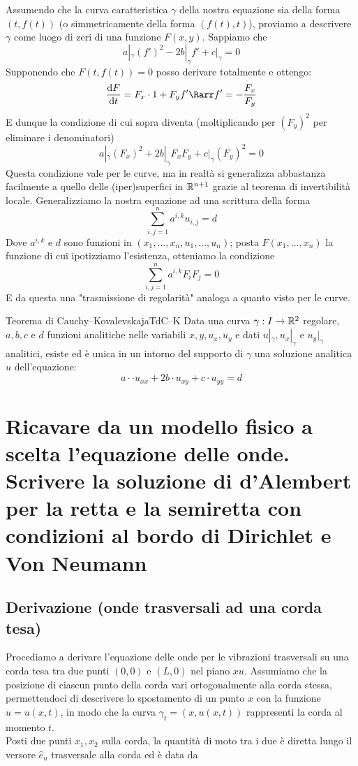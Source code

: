 \documentclass{article}
\begin{document}
Assumendo che la curva caratteristica $\gamma$ della nostra equazione sia della forma $(t,f(t))$ (o simmetricamente della forma $(f(t),t)$), proviamo a descrivere $\gamma$ come luogo di zeri di una funzione $F(x,y)$. Sappiamo che 
\[ a|_\gamma (f')^2 - 2b|_\gamma f' + c|_\gamma = 0 \]
Supponendo che $F(t,f(t))=0$ posso derivare totalmente e ottengo:
\[ \frac{\di F}{\di t} = F_x \cdot 1 + F_y f' \Rarr f' = - \frac{F_x}{F_y} \]
E dunque la condizione di cui sopra diventa (moltiplicando per $(F_y)^2$ per eliminare i denominatori)
\[ a|_\gamma (F_x)^2 + 2b|_\gamma F_x F_y + c|_\gamma (F_y)^2 = 0 \]
Questa condizione vale per le curve, ma in realtà si generalizza abbastanza facilmente a quello delle (iper)superfici in $\mathbb{R}^{n+1}$ grazie al teorema di invertibilità locale. Generalizziamo la nostra equazione ad una scrittura della forma
\[ \sum_{i,j = 1}^n a^{i,k} u_{i,j} = d \]
Dove $a^{i,k}$ e $d$ sono funzioni in $(x_1,..., x_n, u_1, ... , u_n)$; posta $F(x_1,..., x_n)$ la funzione di cui ipotizziamo l'esistenza, otteniamo la condizione
\[ \sum_{i,j=1}^n a^{i,k} F_i F_j = 0 \]
E da questa una "trasmissione di regolarità" analoga a quanto visto per le curve.

\begin{theorem}{Teorema di Cauchy--Kovalevskaja}{TdC--K}
    Data una curva $\gamma : I \to \mathbb{R}^2$ regolare, $a,b,c$ e $d$ funzioni analitiche nelle variabili $x,y, u_x, u_y$ e dati $u|_\gamma, u_x|_\gamma$ e $u_y|_\gamma$ analitici, esiste ed è unica in un intorno del supporto di $\gamma$ una soluzione analitica $u$ dell'equazione:
    \[ a\cdot \cdot u_{xx} + 2b \cdot u_{xy} + c \cdot  u_{yy} = d \]
\end{theorem}

\section{Ricavare da un modello fisico a scelta l'equazione delle onde. Scrivere la soluzione di d'Alembert per la retta e la semiretta con condizioni al bordo di Dirichlet e Von Neumann}

\subsection{Derivazione (onde trasversali ad una corda tesa)}

Procediamo a derivare l'equazione delle onde per le vibrazioni trasversali su una corda tesa tra due punti $(0,0)$ e $(L,0)$ nel piano $xu$. Assumiamo che la posizione di ciascun punto della corda vari ortogonalmente alla corda stessa, permettendoci di descrivere lo spostamento di un punto $x$ con la funzione $u = u(x,t)$, in modo che la curva $\gamma_t =(x, u(x,t))$ rappresenti la corda al momento $t$.\\
Posti due punti $x_1, x_2$ sulla corda, la quantità di moto tra i due è diretta lungo il versore $\hat{e}_u$ trasversale alla corda ed è data da
\end{document}
